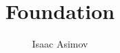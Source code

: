 \documentclass[tgheros,headers,manuscript,12pt]{salford}
\author{Isaac Asimov}
\title{Foundation}
\theoremstyle{definition}
\begin{document}
\linenumbers %

\frontmatter








\mainmatter



% 
%
%


\backmatter




\appendix


\end{document}
